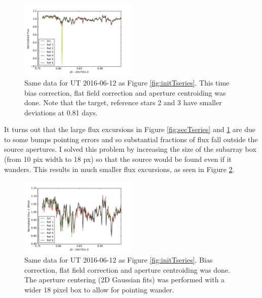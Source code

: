 \documentclass[twocolumn]{aastex61}
\begin{document}
\begin{figure}
\begin{centering}
\includegraphics[width=0.5\textwidth]{second_t_series_bias_flat.pdf}
\caption{Same data for UT 2016-06-12 as Figure \ref{fig:initTseries}.
This time bias correction, flat field correction and aperture centroiding was done.
Note that the target, reference stars 2 and 3 have smaller deviations at 0.81 days.}\label{fig:secTseriesBiasFlat}
\end{centering}
\end{figure}

It turns out that the large flux excursions in Figure \ref{fig:secTseries} and \ref{fig:secTseriesBiasFlat} are due to some bumps pointing errors and so substantial fractions of flux fall outside the source apertures.
I solved this problem by increasing the size of the subarray box (from 10 pix width to 18 px) so that the source would be found even if it wanders.
This results in much smaller flux excursions, as seen in Figure \ref{fig:secTseriesWiderBox}.

\begin{figure}
\begin{centering}
\includegraphics[width=0.5\textwidth]{second_t_series_wider_box.pdf}
\caption{Same data for UT 2016-06-12 as Figure \ref{fig:initTseries}.
Bias correction, flat field correction and aperture centroiding was done.
The aperture centering (2D Gaussian fits) was performed with a wider 18 pixel box to allow for pointing wander.}\label{fig:secTseriesWiderBox}
\end{centering}
\end{figure}
\end{document}
